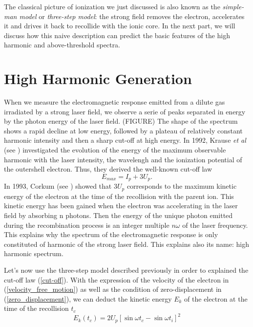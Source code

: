 \documentclass[a4paper]{article}
\begin{document}
The classical picture of ionization we just discussed is also known as the \textit{simple-man model} or \textit{three-step model}:
the strong field removes the electron, accelerates it and drives it back to recollide with the ionic core.
In the next part, we will discuss how this naive description can predict the basic features of the high harmonic and above-threshold spectra.

\section{High Harmonic Generation}

When we measure the electromagnetic response emitted from a dilute gas irradiated by a strong laser field, we observe a serie of peaks separated in energy by the photon energy of the laser field. (FIGURE) The shape of the spectrum shows a rapid decline at low energy, followed by a plateau of relatively constant harmonic intensity and then a sharp cut-off at high energy.
In 1992, Krause \textit{et al} (see \cite{Krause_1992}) investigated the evolution of the energy of the maximum observable harmonic with the laser intensity, the wavelengh and the ionization potential of the outershell electron. Thus, they derived the well-known cut-off law
\begin{equation}
\label{cut-off}
E_{max}=I_{p}+3U_{p}.
\end{equation}
In 1993, Corkum (see \cite{Corkum_1993}) showed that $3U_{p}$ corresponds to the maximum kinetic energy of the electron at the time of the recollision with the parent ion. This kinetic energy has been gained when the electron was accelerating in the laser field by absorbing n photons. Then the energy of the unique photon emitted during the recombination process is an integer multiple $n\omega$ of the laser frequency. This explains why the spectrum of the electromagnetic response is only constituted of harmonic of the strong laser field. This explains also its name: high harmonic spectrum.
\par 
Let's now use the three-step model described previously in order to explained the cut-off law (\ref{cut-off}).
With the expression of the velocity of the electron in (\ref{velocity_free_motion}) as well as the condition of zero-displacement in (\ref{zero_displacement}), we can deduct the kinetic energy $E_{k}$ of the electron at the time of the recollision $t_{c}$
\begin{equation}
E_{k}(t_{c})=2U_{p}\left[ \sin{\omega t_{c}}-\sin{\omega t_{i}}\right ]^{2}
\end{equation}
\end{document}
